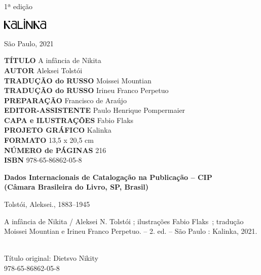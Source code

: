 {\vfill

\begin{center}
1ª edição

\smallskip

\includegraphics[width=2.2cm]{./LOGOTIPO_KALINKA.jpg}

São Paulo, 2021
\end{center}

\pagebreak
\flushleft
\pagestyle{empty}
\tiny


\textbf{TÍTULO} A infância de Nikita\\
\textbf{AUTOR} Aleksei Tolstói\\
\textbf{TRADUÇÃO do RUSSO} Moissei Mountian\\
\textbf{TRADUÇÃO do RUSSO} Irineu Franco Perpetuo\\
\textbf{PREPARAÇÃO} Francisco de Araújo\\
\textbf{EDITOR-ASSISTENTE} Paulo Henrique Pompermaier\\
\textbf{CAPA e ILUSTRAÇÕES} Fabio Flaks\\
\textbf{PROJETO GRÁFICO} Kalinka\\
\textbf{FORMATO} 13,5 x 20,5 cm\\
\textbf{NÚMERO de PÁGINAS} 216\\
\textbf{ISBN} 978-65-86862-05-8\\

\bigskip

\begin{flushleft}
\textbf{Dados Internacionais de Catalogação na Publicação -- CIP}\\
\textbf{(Câmara Brasileira do Livro, SP, Brasil)}\\
\hrulefill
\end{flushleft}
\hspace{5pt}Tolstói, Aleksei., 1883--1945\\
\hspace{20pt}\parbox{185pt}{A infância de Nikita / Aleksei N. Tolstói ; ilustrações Fabio Flaks~; tradução Moissei Mountian e Irineu Franco Perpetuo. -- 2. ed. -- São Paulo :
Kalinka, 2021.}\\[6pt]

\hspace{20pt}Título original: Dietsvo Nikity\\
\hspace{20pt} 978-65-86862-05-8\\[6pt]

}
